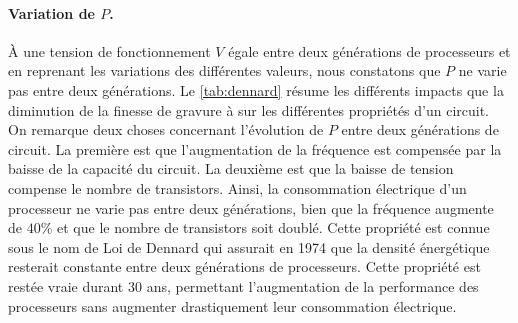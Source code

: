         
        \paragraph{Variation de $P$.} À une tension de fonctionnement $V$ égale entre deux générations de processeurs et en reprenant les variations des différentes valeurs, nous constatons que $P$ ne varie pas entre deux générations. Le \autoref{tab:dennard} résume les différents impacts que la diminution de la finesse de gravure à sur les différentes propriétés d'un circuit. On remarque deux choses concernant l'évolution de $P$ entre deux générations de circuit. La première est que l'augmentation de la fréquence est compensée par la baisse de la capacité du circuit. La deuxième est que la baisse de tension compense le nombre de transistors. Ainsi, la consommation électrique d'un processeur ne varie pas entre deux générations, bien que la fréquence augmente de $40\%$ et que le nombre de transistors soit doublé. Cette propriété est connue sous le nom de Loi de Dennard \cite{Dennard1974} qui assurait en 1974 que la densité énergétique resterait constante entre deux générations de processeurs. Cette propriété est restée vraie durant 30 ans, permettant l'augmentation de la performance des processeurs sans augmenter drastiquement leur consommation électrique. 
        
        \begin{table}[]
        \centering
        \caption{ Résumé des impacts de la diminution de la finesse de gravure d'un facteur $\sqrt{2}$\protect\footnotemark.}
        \label{tab:dennard}
        \end{table}
        
